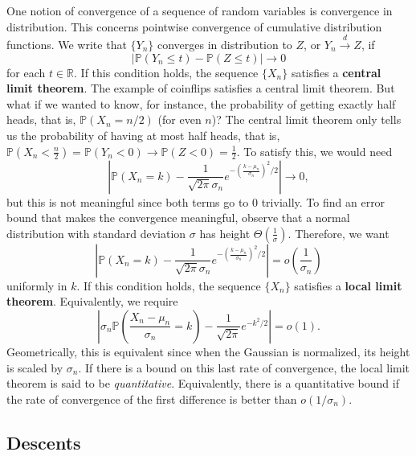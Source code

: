 \documentclass[12pt]{article} %
\newcommand{\f}[2]{\frac{#1}{#2}}
\newcommand{\p}[1]{\left(#1\right)}
\newcommand{\abs}[1]{\left\lvert#1\right\rvert}
\newcommand{\R}{\mathbb{R}}
\renewcommand{\P}{\mathbb{P}}
\theoremstyle{definition}
\theoremstyle{definition}
\begin{document}
One notion of convergence of a sequence of random variables is convergence in distribution. This concerns pointwise convergence of cumulative distribution functions. We write that $\{Y_n\}$ converges in distribution to $Z$, or $Y_n \xrightarrow{d} Z$, if
\[ \abs{\P(Y_n \leq t) - \P(Z \leq t)} \to 0 \]
for each $t \in \R$. If this condition holds, the sequence $\{X_n\}$ satisfies a \textbf{central limit theorem}. The example of coinflips satisfies a central limit theorem. But what if we wanted to know, for instance, the probability of getting exactly half heads, that is, $\P(X_n = n/2)$ (for even $n$)? The central limit theorem only tells us the probability of having at most half heads, that is, $\P(X_n < \f{n}{2}) = \P(Y_n < 0) \to \P(Z < 0) = \f{1}{2}$. To satisfy this, we would need
\[ \abs{\P(X_n = k) - \f{1}{\sqrt{2\pi}\sigma_n} e^{-\p{\f{k - \mu_n}{\sigma_n}}^2/2}} \to 0, \]
but this is not meaningful since both terms go to $0$ trivially. To find an error bound that makes the convergence meaningful, observe that a normal distribution with standard deviation $\sigma$ has height $\Theta(\f{1}{\sigma})$. Therefore, we want
\[ \abs{\P(X_n = k) - \f{1}{\sqrt{2\pi}\sigma_n} e^{-\p{\f{k - \mu_n}{\sigma_n}}^2/2}} = o\p{\f{1}{\sigma_n}} \]
uniformly in $k$. If this condition holds, the sequence $\{X_n\}$ satisfies a \textbf{local limit theorem}. Equivalently, we require
\[ \abs{\sigma_n \P\p{\f{X_n-\mu_n}{\sigma_n} = k} - \f{1}{\sqrt{2\pi}} e^{-k^2/2}} = o(1). \]
Geometrically, this is equivalent since when the Gaussian is normalized, its height is scaled by $\sigma_n$. If there is a bound on this last rate of convergence, the local limit theorem is said to be \textit{quantitative}. Equivalently, there is a quantitative bound if the rate of convergence of the first difference is better than $o(1/\sigma_n)$.

\subsection{Descents} \label{descents-intro}
\end{document}

